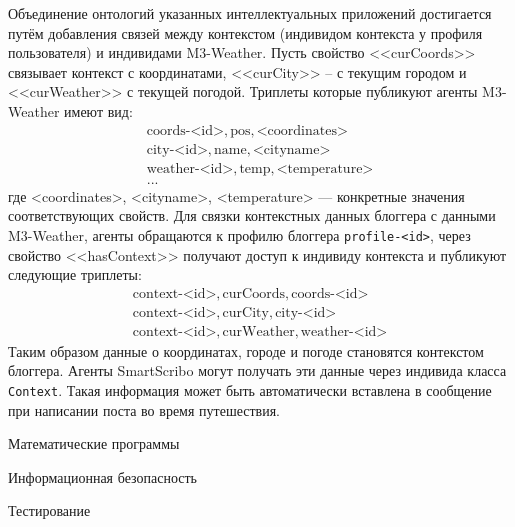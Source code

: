 Объединение онтологий указанных интеллектуальных приложений достигается путём добавления связей между контекстом (индивидом контекста у профиля пользователя) и индивидами M3-Weather. Пусть свойство <<curCoords>> связывает контекст с координатами, <<curCity>> -- с текущим городом и <<curWeather>> с текущей погодой. Триплеты которые публикуют агенты M3-Weather имеют вид:
$$
\begin{array}{l}
\mbox{coords-<id>}, \mbox{pos}, \mbox{<coordinates>}\\
\mbox{city-<id>}, \mbox{name}, \mbox{<cityname>}\\
\mbox{weather-<id>}, \mbox{temp}, \mbox{<temperature>}\\
...
\end{array}
$$
где <coordinates>, <cityname>, <temperature> --- конкретные значения соответствующих свойств. Для связки контекстных данных блоггера с данными M3-Weather, агенты обращаются к профилю блоггера {\tt profile-<id>}, через свойство <<hasContext>> получают доступ к индивиду контекста и публикуют следующие триплеты:
$$
\begin{array}{l}
\mbox{context-<id>}, \mbox{curCoords}, \mbox{coords-<id>}\\
\mbox{context-<id>}, \mbox{curCity}, \mbox{city-<id>}\\
\mbox{context-<id>}, \mbox{curWeather}, \mbox{weather-<id>}
\end{array}
$$
Таким образом данные о координатах, городе и погоде становятся контекстом блоггера. Агенты SmartScribo могут получать эти данные через индивида класса {\tt Context}. Такая информация может быть автоматически вставлена в сообщение при написании поста во время путешествия.






Математические программы



Информационная безопасность



Тестирование